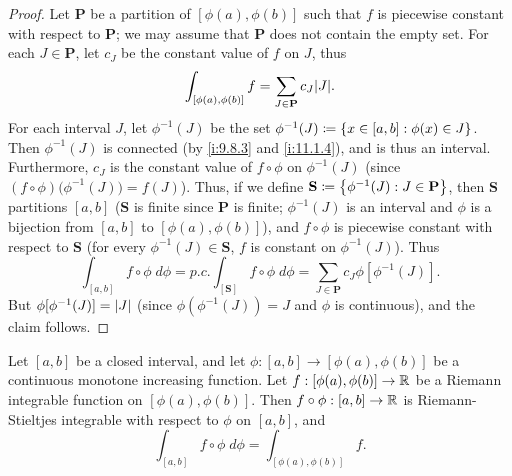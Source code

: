\begin{proof}
  Let \(\mathbf{P}\) be a partition of \([\phi(a), \phi(b)]\) such that \(f\) is piecewise constant with respect to \(\mathbf{P}\);
  we may assume that \(\mathbf{P}\) does not contain the empty set.
  For each \(J \in \mathbf{P}\), let \(c_J\) be the constant value of \(f\) on \(J\), thus
  \[
    \int_{[\phi(a), \phi(b)]} f = \sum_{J \in \mathbf{P}} c_J \abs{J}.
  \]
  For each interval \(J\), let \(\phi^{-1}(J)\) be the set \(\phi^{-1}(J) \coloneqq \left\lbrace x \in [a, b] : \phi(x) \in J\right\rbrace\).
  Then \(\phi^{-1}(J)\) is connected (by \cref{i:9.8.3} and \cref{i:11.1.4}), and is thus an interval.
  Furthermore, \(c_J\) is the constant value of \(f \circ \phi\) on \(\phi^{-1}(J)\) (since \((f \circ \phi)\big(\phi^{-1}(J)\big) = f(J)\)).
  Thus, if we define \(\mathbf{S} \coloneqq \left\lbrace\phi^{-1} (J) : J \in \mathbf{P}\right\rbrace\), then \(\mathbf{S}\) partitions \([a, b]\)
  (\(\mathbf{S}\) is finite since \(\mathbf{P}\) is finite;
  \(\phi^{-1}(J)\) is an interval and \(\phi\) is a bijection from \([a, b]\) to \([\phi(a), \phi(b)]\)),
  and \(f \circ \phi\) is piecewise constant with respect to \(\mathbf{S}\) (for every \(\phi^{-1}(J) \in \mathbf{S}\), \(f\) is constant on \(\phi^{-1}(J)\)).
  Thus
  \[
    \int_{[a, b]} f \circ \phi \; d \phi = p.c. \int_{[\mathbf{S}]} f \circ \phi \; d \phi = \sum_{J \in \mathbf{P}} c_J \phi[\phi^{-1}(J)].
  \]
  But \(\phi[\phi^{-1}(J)] = \left\lvert J\right\rvert\) (since \(\phi(\phi^{-1}(J)) = J\) and \(\phi\) is continuous), and the claim follows.
\end{proof}

\begin{prop}\label{i:11.10.6}
  Let \([a, b]\) be a closed interval, and let \(\phi : [a, b] \to [\phi(a), \phi(b)]\) be a continuous monotone increasing function.
  Let \(f : [\phi(a), \phi(b)] \to \mathbb{R}\) be a Riemann integrable function on \([\phi(a), \phi(b)]\).
  Then \(f \circ \phi : [a, b] \to \mathbb{R}\) is Riemann-Stieltjes integrable with respect to \(\phi\) on \([a, b]\), and
  \[
    \int_{[a, b]} f \circ \phi \; d \phi = \int_{[\phi(a), \phi(b)]} f.
  \]
\end{prop}

